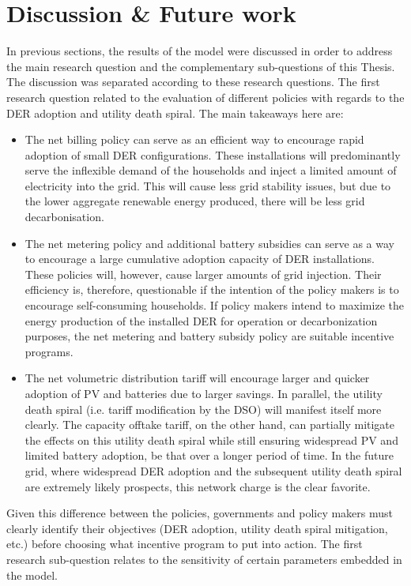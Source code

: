 \section{Discussion \& Future work} \label{future}
In previous sections, the results of the model were discussed in order to address the main research question and the complementary sub-questions of this Thesis. The discussion was separated according to these research questions. The first research question related to the evaluation of different policies with regards to the DER adoption and utility death spiral. The main takeaways here are:
\begin{itemize}
\item The net billing policy can serve as an efficient way to encourage rapid adoption of small DER configurations. These installations will predominantly serve the inflexible demand of the households and inject a limited amount of electricity into the grid. This will cause less grid stability issues, but due to the lower aggregate renewable energy produced, there will be less grid decarbonisation. 
\item The net metering policy and additional battery subsidies can serve as a way to encourage a large cumulative adoption capacity of DER installations. These policies will, however, cause larger amounts of grid injection. Their efficiency is, therefore, questionable if the intention of the policy makers is to encourage self-consuming households. If policy makers intend to maximize the energy production of the installed DER for operation or decarbonization purposes, the net metering and battery subsidy policy are suitable incentive programs.
\item The net volumetric distribution tariff will encourage larger and quicker adoption of PV and batteries due to larger savings. In parallel, the utility death spiral (i.e. tariff modification by the DSO) will manifest itself more clearly. The capacity offtake tariff, on the other hand, can partially mitigate the effects on this utility death spiral while still ensuring widespread PV and limited battery adoption, be that over a longer period of time. In the future grid, where widespread DER adoption and the subsequent utility death spiral are extremely likely prospects, this network charge is the clear favorite. 
\end{itemize}
Given this difference between the policies, governments and policy makers must clearly identify their objectives (DER adoption, utility death spiral mitigation, etc.) before choosing what incentive program to put into action. The first research sub-question relates to the sensitivity of certain parameters embedded in the model. 
